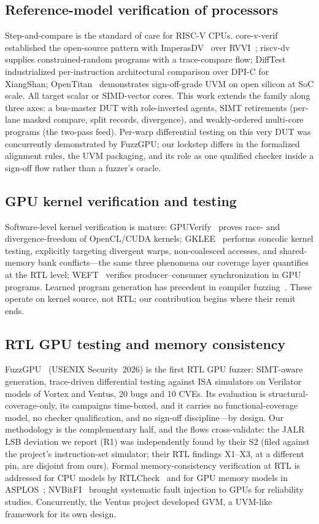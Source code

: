 \documentclass[review,12pt]{elsarticle}
\begin{document}
\subsection{Reference-model verification of processors}
Step-and-compare is the standard of care for RISC-V CPUs.
core-v-verif~\cite{corevverif} established the open-source pattern
with ImperasDV~\cite{imperasdv} over RVVI~\cite{rvvi};
riscv-dv~\cite{riscvdv} supplies constrained-random programs with a
trace-compare flow; DiffTest~\cite{difftest} industrialized
per-instruction architectural comparison over DPI-C for XiangShan;
OpenTitan~\cite{opentitan} demonstrates sign-off-grade UVM on open
silicon at SoC scale. All target scalar or SIMD-vector cores. This
work extends the family along three axes: a bus-master DUT with
role-inverted agents, SIMT retirements (per-lane masked compare,
split records, divergence), and weakly-ordered multi-core programs
(the two-pass feed). Per-warp differential testing on this very DUT
was concurrently demonstrated by FuzzGPU; our lockstep differs in the
formalized alignment rules, the UVM packaging, and its role as one
qualified checker inside a sign-off flow rather than a fuzzer's
oracle.

\subsection{GPU kernel verification and testing}
Software-level kernel verification is mature:
GPUVerify~\cite{gpuverify} proves race- and divergence-freedom of
OpenCL/CUDA kernels; GKLEE~\cite{gklee} performs concolic kernel
testing, explicitly targeting divergent warps, non-coalesced
accesses, and shared-memory bank conflicts---the same three phenomena
our coverage layer quantifies at the RTL level;
WEFT~\cite{weft} verifies producer--consumer synchronization in GPU
programs. Learned program generation has precedent in compiler
fuzzing~\cite{deepsmith}. These operate on kernel source, not RTL;
our contribution begins where their remit ends.

\subsection{RTL GPU testing and memory consistency}
FuzzGPU~\cite{fuzzgpu} (USENIX Security~2026) is the first RTL GPU
fuzzer: SIMT-aware generation, trace-driven differential testing
against ISA simulators on Verilator models of Vortex and Ventus,
20 bugs and 10 CVEs. Its evaluation is structural-coverage-only, its
campaigns time-boxed, and it carries no functional-coverage model,
no checker qualification, and no sign-off discipline---by design.
Our methodology is the complementary half, and the flows
cross-validate: the JALR LSB deviation we report (R1) was
independently found by their S2 (filed against the project's
instruction-set simulator; their RTL findings X1--X3, at a different
pin, are disjoint from ours). Formal memory-consistency verification
at RTL is addressed for CPU models by RTLCheck~\cite{rtlcheck} and
for GPU memory models in ASPLOS~\cite{ptxmem}; NVBitFI~\cite{nvbitfi}
brought systematic fault injection to GPUs for reliability studies.
Concurrently, the Ventus project developed GVM, a UVM-like framework
for its own design.
\end{document}
